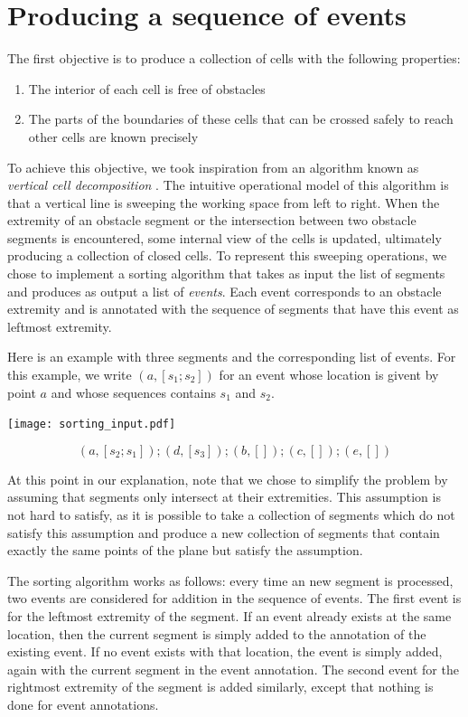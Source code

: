 \documentclass{easychair}
\begin{document}
\section{Producing a sequence of events}
The first objective is to produce a collection of cells with the following
properties:
\begin{enumerate}
\item The interior of each cell is free of obstacles
\item The parts of the boundaries of these cells that can be crossed
  safely to reach other cells are known precisely
\end{enumerate}
To achieve this objective, we took inspiration from an algorithm known as
{\em vertical cell decomposition} \cite{Latombe91}.  The intuitive
operational model of this algorithm is that a vertical line is
sweeping the working space from left to right.  When the extremity of
an obstacle segment or the intersection between two obstacle segments
is encountered, some internal view of the cells is updated, ultimately
producing a collection of closed cells.  To represent this sweeping
operations, we chose to implement a sorting algorithm that takes as
input the list of segments and produces as output a list of {\em
  events}.  Each event corresponds to an obstacle extremity and is
annotated with the sequence of segments that have this event as
leftmost extremity.

Here is an example with three segments and the corresponding list of events.
For this example, we write \((a, [s_1;s_2])\) for an event whose location is
givent by point \(a\) and whose sequences contains \(s_1\) and \(s_2\).

\begin{center}
\texttt{[image: sorting\_input.pdf]}
\end{center}
\[ (a, [s_2; s_1]); (d, [s_3]); (b, []); (c, []); (e,[])\]

At this point in our explanation, note that we chose to
simplify the problem by assuming that segments only intersect at their
extremities.  This assumption is not hard
to satisfy, as it is possible to take a collection of segments which
do not satisfy this assumption and produce a new collection of
segments that contain exactly the same points of the plane but satisfy
the assumption.

The sorting algorithm works as follows: every time an new segment is
processed, two events are considered for addition in the sequence of events.
The first event is for the leftmost extremity of the segment.  If an
event already exists at the same location, then the current segment is
simply added to the annotation of the existing event.  If no event exists
with that location, the event is simply added, again with the current segment
in the event annotation.  The second event for the rightmost extremity of the
segment is added similarly, except that nothing is done for event annotations.
\end{document}
